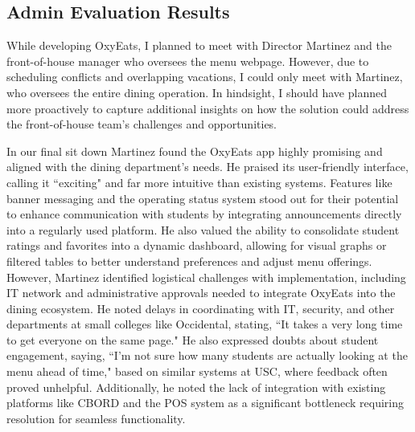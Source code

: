 \documentclass[10pt,twocolumn]{article}
\begin{document}
\subsection{Admin Evaluation Results}
While developing OxyEats, I planned to meet with Director Martinez and the front-of-house manager who oversees the menu webpage. However, due to scheduling conflicts and overlapping vacations, I could only meet with Martinez, who oversees the entire dining operation. In hindsight, I should have planned more proactively to capture additional insights on how the solution could address the front-of-house team’s challenges and opportunities.

In our final sit down Martinez found the OxyEats app highly promising and aligned with the dining department's needs. He praised its user-friendly interface, calling it ``exciting" and far more intuitive than existing systems. Features like banner messaging and the operating status system stood out for their potential to enhance communication with students by integrating announcements directly into a regularly used platform. He also valued the ability to consolidate student ratings and favorites into a dynamic dashboard, allowing for visual graphs or filtered tables to better understand preferences and adjust menu offerings. However, Martinez identified logistical challenges with implementation, including IT network and administrative approvals needed to integrate OxyEats into the dining ecosystem. He noted delays in coordinating with IT, security, and other departments at small colleges like Occidental, stating, ``It takes a very long time to get everyone on the same page." He also expressed doubts about student engagement, saying, ``I’m not sure how many students are actually looking at the menu ahead of time," based on similar systems at USC, where feedback often proved unhelpful. Additionally, he noted the lack of integration with existing platforms like CBORD and the POS system as a significant bottleneck requiring resolution for seamless functionality.
\end{document}
